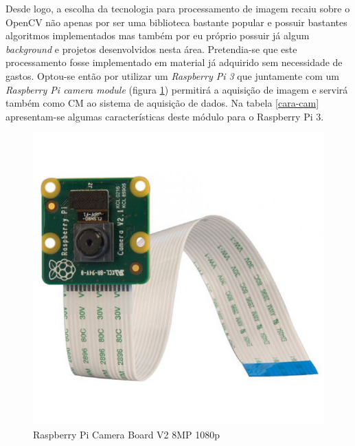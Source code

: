 










Desde logo, a escolha da tecnologia para processamento de imagem recaiu sobre o OpenCV não apenas por ser uma biblioteca bastante popular e possuir bastantes algoritmos implementados mas também por eu próprio possuir já algum \textit{background} e projetos desenvolvidos nesta área. Pretendia-se que este processamento fosse implementado em material já adquirido sem necessidade de gastos. Optou-se então por utilizar um \textit{Raspberry Pi 3} que juntamente com um \textit{Raspberry Pi camera module} (figura \ref{raspicam}) permitirá a aquisição de imagem e servirá também como \acl{CM} ao sistema de aquisição de dados. Na tabela \ref{cara-cam} apresentam-se algumas características deste módulo para o Raspberry Pi 3.
\newpage
 


\begin{figure}[!htb]
	\centering
	\includegraphics[width=0.25\linewidth]{img/hardware/camera_v2.jpg}
	\caption{Raspberry Pi Camera Board V2 8MP 1080p}
	\label{raspicam}
\end{figure}







